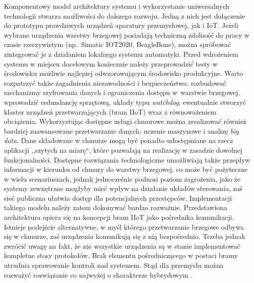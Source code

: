 \documentclass[a4paper, 12pt, twoside]{article}
\begin{document}
Komponentowy model architektury systemu i wykorzystanie uniwersalnych technologii
stwarza możliwości do dalszego rozwoju. Jedną z nich jest dołączenie do prototypu
prawdziwych urządzeń aparatury przemysłowej, jak i IoT. Jeżeli wybrane urządzenia
warstwy brzegowej posiadają techniczną zdolność do pracy w czasie rzeczywistym
(np.~Simatic IOT2020, BeagleBone),
można spróbować zintegrować je z działaniem lokalnego systemu automatyki. Przed wdrożeniem
systemu w miejscu docelowym koniecznie należy przeprowadzić testy w środowisku
możliwie najlepiej odwzorowującym środowisko produkcyjne. Warto rozpatrzyć także
zagadnienia niezawodności i bezpieczeństwa: rozbudować mechanizmy szyfrowania danych
i ograniczenia dostępu w~warstwie brzegowej, wprowadzić redundancję sprzętową,
układy typu \emph{watchdog}, ewentualnie stworzyć klaster urządzeń przetwarzających
(bram IIoT) wraz z równoważeniem obciążenia. Wykorzystując dostępne usługi
chmurowe można zrealizować również bardziej zaawansowane przetwarzanie danych:
uczenie maszynowe i analizę \emph{big data}. Dane składowane w chmurze mogą być
ponadto udostępniane na rzecz aplikacji ,,szytych na miarę``, które pozwalają
na realizację w zasadzie dowolnej funkcjonalności. Dostępne rozwiązania technologiczne
umożliwiają także przepływ informacji w kierunku od chmury do warstwy brzegowej,
co może być pożyteczne w wielu scenariuszach, jednak jednocześnie podnosi
poziom zagrożenia, jako że systemy zewnętrzne mogłyby mieć wpływ na działanie
układów sterowania, zaś sieć publiczna ułatwia dostęp dla potencjalnych przestępców.
Implementacji takiego modelu należy zatem dokonywać bardzo rozważnie.
Przedstawiona architektura opiera się na koncepcji bram IIoT jako pośrednika
komunikacji. Istnieje podejście alternatywne, w myśl którego przetwarzanie brzegowe
odbywa się w chmurze, zaś urządzenia komunikują się z nią bezpośrednio. Trzeba
jednak zwrócić uwagę na fakt, że nie wszystkie urządzenia są w stanie implementować
kompletne stosy protokołów. Brak elementu pośredniczącego w postaci bramy utrudnia
sprawowanie kontroli nad systemem. Stąd dla przemysłu można rozważyć
rozwiązanie co najwyżej o charakterze hybrydowym \cite{analysis-of-different-iot-protocols}.

\newpage
\printbibliography

\newpage



\newpage
\listoffigures

\newpage
\renewcommand{\lstlistlistingname}{Spis listingów}
\lstlistoflistings
\end{document}

